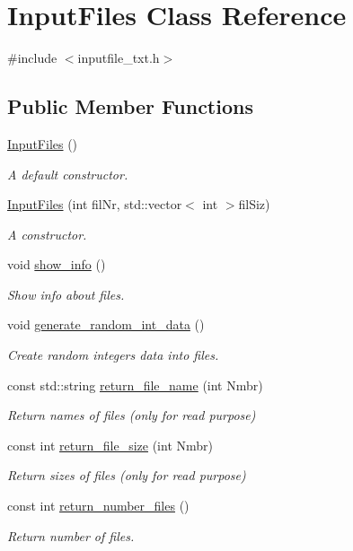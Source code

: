 \hypertarget{class_input_files}{}\section{Input\+Files Class Reference}
\label{class_input_files}


{\ttfamily \#include $<$inputfile\+\_\+txt.\+h$>$}

\subsection*{Public Member Functions}
\begin{DoxyCompactItemize}
\item 
\hyperlink{class_input_files_a85a092f7ad25a9f959f1a93e5afb2045}{Input\+Files} ()
\begin{DoxyCompactList}\small\item\em A default constructor. \end{DoxyCompactList}\item 
\hyperlink{class_input_files_a500e1a86787be57b9525836c6c912311}{Input\+Files} (int fil\+Nr, std\+::vector$<$ int $>$fil\+Siz)
\begin{DoxyCompactList}\small\item\em A constructor. \end{DoxyCompactList}\item 
void \hyperlink{class_input_files_adacb161e743183a2acef22b26dc7b954}{show\+\_\+info} ()
\begin{DoxyCompactList}\small\item\em Show info about files. \end{DoxyCompactList}\item 
void \hyperlink{class_input_files_ae5bb1d7ff253b873327a3a3d84f64584}{generate\+\_\+random\+\_\+int\+\_\+data} ()
\begin{DoxyCompactList}\small\item\em Create random integers data into files. \end{DoxyCompactList}\item 
const std\+::string \hyperlink{class_input_files_a9867703917e916ceea50b9d7d4b07d2f}{return\+\_\+file\+\_\+name} (int Nmbr)
\begin{DoxyCompactList}\small\item\em Return names of files (only for read purpose) \end{DoxyCompactList}\item 
const int \hyperlink{class_input_files_ad0bb8456352c7e008315a284d9003086}{return\+\_\+file\+\_\+size} (int Nmbr)
\begin{DoxyCompactList}\small\item\em Return sizes of files (only for read purpose) \end{DoxyCompactList}\item 
const int \hyperlink{class_input_files_a5b1547e90d17d2332daed2203939ce25}{return\+\_\+number\+\_\+files} ()
\begin{DoxyCompactList}\small\item\em Return number of files. \end{DoxyCompactList}\end{DoxyCompactItemize}


